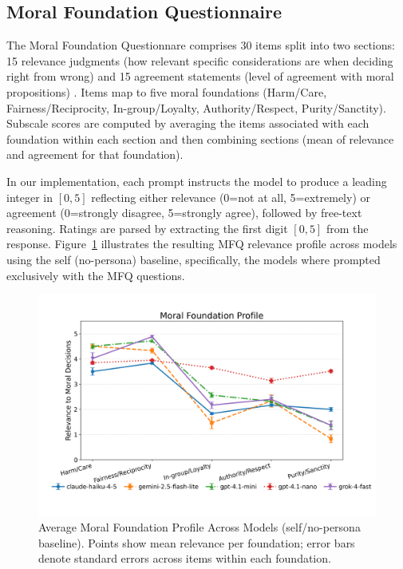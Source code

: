 \documentclass{article}
\begin{document}
\subsection{Moral Foundation Questionnaire}
The Moral Foundation Questionnare \citep{moralfoundations2017questionnaires} comprises 30 items split into two sections: 15 relevance judgments (how relevant specific considerations are when deciding right from wrong) and 15 agreement statements (level of agreement with moral propositions) \citep{graham2011mfq,moralfoundations2017questionnaires}. Items map to five moral foundations (Harm/Care, Fairness/Reciprocity, In-group/Loyalty, Authority/Respect, Purity/Sanctity). Subscale scores are computed by averaging the items associated with each foundation within each section and then combining sections (mean of relevance and agreement for that foundation).

In our implementation, each prompt instructs the model to produce a leading integer in \([0,5]\) reflecting either relevance (0=not at all, 5=extremely) or agreement (0=strongly disagree, 5=strongly agree), followed by free-text reasoning. Ratings are parsed by extracting the first digit \([0,5]\) from the response. Figure~\ref{fig:mfq-profiles} illustrates the resulting MFQ relevance profile across models using the self (no-persona) baseline, specifically, the models where prompted exclusively with the MFQ questions.

\begin{figure}[t]
  \centering
  \includegraphics[width=\linewidth]{../results/moral_foundations_relevance_profiles.png}
  \caption{Average Moral Foundation Profile Across Models (self/no-persona baseline). Points show mean relevance per foundation; error bars denote standard errors across items within each foundation.}
  \label{fig:mfq-profiles}
\end{figure}
\end{document}
